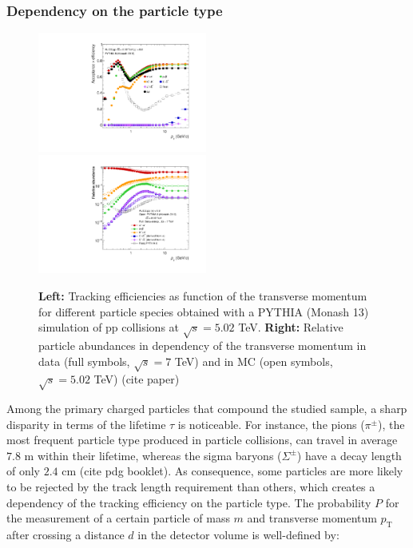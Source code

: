 \documentclass[12pt,a4paper]{report}
\begin{document}
\subsubsection{Dependency on the particle type}
\begin{figure}[tb!]
\centering
\includegraphics[width=0.495\textwidth]{Plots/5TeVMonash13_TrkEff_without-91972.pdf}  
\includegraphics[width=0.495\textwidth]{Plots/5TeVMonash13_Abundances-91973.pdf}  
\caption{\textbf{Left: }Tracking efficiencies as function of the transverse momentum for different particle species obtained with a PYTHIA (Monash 13) simulation of pp collisions at $\sqrt{s} = 5.02$ TeV. \textbf{Right:} Relative particle abundances in dependency of the transverse momentum in data (full symbols,  $\sqrt{s} = 7$ TeV) and in MC (open symbols,  $\sqrt{s} = 5.02$ TeV) (cite paper)}
\label{trckEffParticles}
\end{figure}
Among the primary charged particles that compound the studied sample, a sharp disparity in terms of the lifetime $\tau$ is noticeable. For instance, the pions ($\pi^{\pm}$), the most frequent particle type produced in particle collisions, can travel in average $7.8\text{ m}$ within their lifetime, whereas the sigma baryons ($\Sigma^{\pm}$) have a decay length of only $2.4\text{ cm}$  (cite pdg booklet). As consequence, some particles are more likely to be rejected by the track length requirement than others, which creates a dependency of the tracking efficiency on the particle type. The probability $P$ for the measurement of a certain particle of mass $m$ and transverse momentum $p_\text{T}$ after crossing a distance $d$ in the detector volume is well-defined by:
\end{document}
